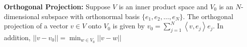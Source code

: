 {\bf Orthogonal Projection:} Suppose $V$ is an inner product space and $V_0$ is an $N$-dimensional subspace with orthonormal basis $\{e_1,e_2,\dots , e_N\}$. The orthogonal projection of a vector $v\in V$ onto $V_0$ is given by $v_0=\sum_{j=1}^{N}\left\langle v,e_j\right\rangle e_j$. In addition, $\left|\left|v-v_0\right|\right|=\min_{w\in V_0}\left|\left|v-w\right|\right|$
